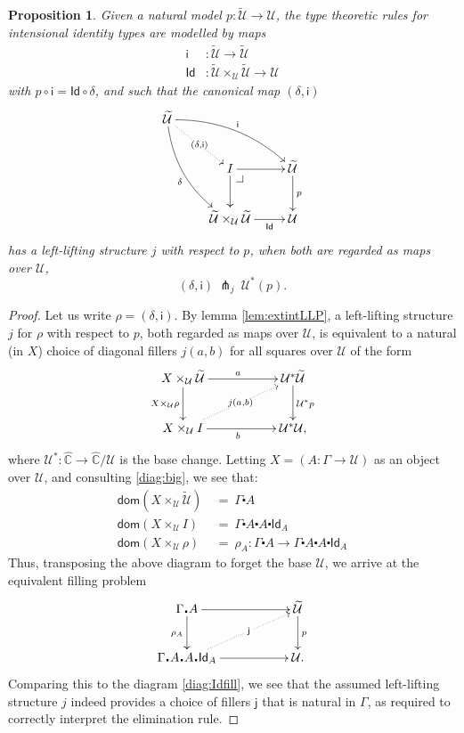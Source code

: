 \documentclass[12pt]{article}
\makeatletter
\newcommand{\Chat}{\ensuremath{\widehat{\mathbb{C}}}}
\newcommand{\pbcorner}[1][dr]{\save*!/#1-1.2pc/#1:(-1,1)@^{|-}\restore}
\newcommand{\dom}{\ensuremath{\mathsf{dom}}}
\newcommand{\G}{\ensuremath{\Gamma}}
\newcommand{\exdot}{\ensuremath{\!\centerdot\!}}
\newcommand{\Id}{\mathsf{Id}}
\newcommand{\jay}{\mathsf{j}}
\newcommand{\iy}{\mathsf{i}}
\newcommand{\U}{\ensuremath{\mathcal{U}}}
\newcommand{\UU}{\ensuremath{\widetilde{\mathcal{U}}}}
\newtheorem{proposition}[theorem]{Proposition}
\theoremstyle{definition}
\makeatother
\begin{document}
\begin{proposition}\label{prop:intid} 
Given a natural model $p : \UU \to \U$,  the type theoretic rules for \emph{intensional} identity types are modelled by maps  
\begin{align}
\iy &: \UU \to \UU \label{prop:inteq1}\\
\Id &: \UU\times_\U \UU \to \U \label{prop:inteq2}
\end{align}
with $p\circ \iy = \Id\circ \delta$, and such that the canonical map $(\delta,\iy)$
%
\begin{equation*}%
\xymatrix{
\UU \ar@/{}_{1pc}/[ddr]_{\delta} \ar@{.>}[dr]|-{(\delta,\iy)} \ar@/{}^{1pc}/[drr]^{\iy} &&\\
& I \ar[r]  \ar[d]  \pbcorner & \UU \ar[d]^p \\
& \UU\times_\U \UU \ar[r]_-{\Id} & \U
}
\end{equation*}
%
has a left-lifting structure $j$ with respect to $p$, when both are regarded as maps over $\U$,
$$(\delta,\iy)\ \pitchfork_j\ \U^*(p).$$

\end{proposition}

\begin{proof}
Let us write $\rho = (\delta,\iy)$.  By  lemma \ref{lem:extintLLP}, a left-lifting structure $j$ for $\rho$ with respect to $p$,  both  regarded as maps over $\U$,  is equivalent to a natural (in $X$) choice of diagonal fillers $j(a,b)$ for all squares over $\U$ of the form
\[
\xymatrix{
X\times_\U \UU \ar[d]_{X\times_\U{\rho}} \ar[rr]^{a} && \U^*\UU \ar[d]^{\U^*p} \\
X\times_\U I \ar[rr]_{b} \ar@{.>}[urr]|-{\ j(a,b)\ } && \U^*\U,
}
\]
where $\U^* : \Chat \to \Chat/\U$ is the base change.  Letting $X = (A : \Gamma \to \U)$ as an object over $\U$, and consulting \eqref{diag:big}, we see that:
\begin{align*}
\dom(X\times_\U \UU)\ &=\ \G\exdot A \\
\dom(X\times_\U I) \ &=\  \G\exdot A\exdot A\exdot\Id_A  \\
\dom(X\times_\U{\rho})\ &=\ \rho_A : \G\exdot A \to  \G\exdot A\exdot A\exdot\Id_A 
\end{align*}
Thus, transposing the above diagram to forget the base $\U$, we arrive at the equivalent filling problem
\[
\xymatrix{
\G\exdot A \ar[d]_{\rho_A} \ar[rr] && \UU \ar[d]^{p} \\
 \G\exdot A\exdot A\exdot\Id_A  \ar[rr]  \ar@{.>}[urr]|-{\ \jay\ }&& \U.
}
\]
Comparing this to the diagram \eqref{diag:Idfill}, we see that the assumed left-lifting structure $j$ indeed provides a choice of fillers $\jay$ that is natural in $\G$, as required to correctly interpret the elimination rule.
\end{proof}
\end{document}

